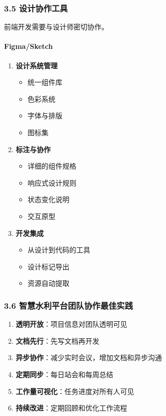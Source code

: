 \subsubsection{3.5
设计协作工具}\label{ux8bbeux8ba1ux534fux4f5cux5de5ux5177}

前端开发需要与设计师密切协作。

\paragraph{Figma/Sketch}\label{figmasketch}

\begin{enumerate}
\def\labelenumi{\arabic{enumi}.}
\tightlist
\item
  \textbf{设计系统管理}

  \begin{itemize}
  \tightlist
  \item
    统一组件库
  \item
    色彩系统
  \item
    字体与排版
  \item
    图标集
  \end{itemize}
\item
  \textbf{标注与协作}

  \begin{itemize}
  \tightlist
  \item
    详细的组件规格
  \item
    响应式设计规则
  \item
    状态变化说明
  \item
    交互原型
  \end{itemize}
\item
  \textbf{开发集成}

  \begin{itemize}
  \tightlist
  \item
    从设计到代码的工具
  \item
    设计标记导出
  \item
    资源自动提取
  \end{itemize}
\end{enumerate}

\subsubsection{3.6
智慧水利平台团队协作最佳实践}\label{ux667aux6167ux6c34ux5229ux5e73ux53f0ux56e2ux961fux534fux4f5cux6700ux4f73ux5b9eux8df5}

\begin{enumerate}
\def\labelenumi{\arabic{enumi}.}
\tightlist
\item
  \textbf{透明开放}：项目信息对团队透明可见
\item
  \textbf{文档先行}：先写文档再开发
\item
  \textbf{异步协作}：减少实时会议，增加文档和异步沟通
\item
  \textbf{定期同步}：每日站会和每周总结
\item
  \textbf{工作量可视化}：任务进度对所有人可见
\item
  \textbf{持续改进}：定期回顾和优化工作流程
\end{enumerate}

